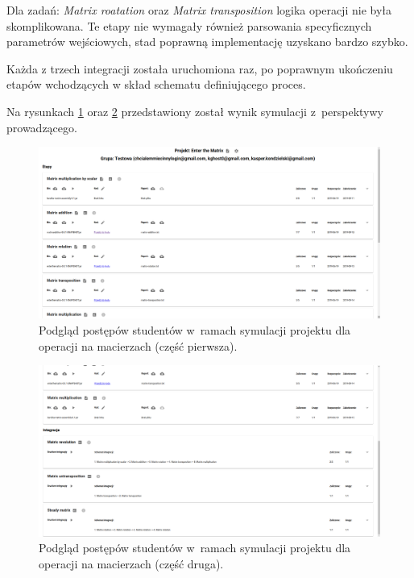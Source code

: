 Dla zadań: \textit{Matrix roatation} oraz \textit{Matrix transposition} logika operacji nie była skomplikowana.
Te etapy nie wymagały również parsowania specyficznych parametrów wejściowych, stad poprawną implementację uzyskano bardzo szybko.

Każda z trzech integracji została uruchomiona raz, po poprawnym ukończeniu etapów wchodzących w skład schematu definiującego proces.

Na rysunkach \ref{fig:matrix_preview_part_1} oraz \ref{fig:matrix_preview_part_2} przedstawiony został wynik symulacji z~perspektywy prowadzącego.

\begin{figure}[h]
    \centering
    \includegraphics[width = 16cm]{chapter07/matrix_preview_part_1.png}
    \caption{Podgląd postępów studentów w~ramach symulacji projektu dla operacji na macierzach (część pierwsza).}
    \label{fig:matrix_preview_part_1}
\end{figure}

\begin{figure}[h]
    \centering
    \includegraphics[width = 16cm]{chapter07/matrix_preview_part_2.png}
    \caption{Podgląd postępów studentów w~ramach symulacji projektu dla operacji na macierzach (część druga).}
    \label{fig:matrix_preview_part_2}
\end{figure}


